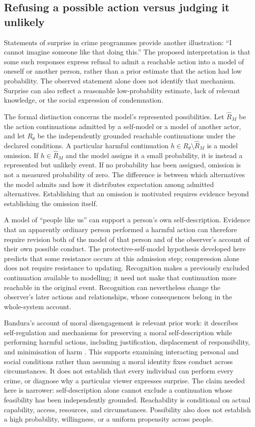 \documentclass[11pt,a4paper]{article}
\theoremstyle{remark}
\begin{document}
\subsection{Refusing a possible action versus judging it unlikely}

Statements of surprise in crime programmes provide another illustration:
``I cannot imagine someone like that doing this.'' The proposed interpretation
is that some such responses express refusal to admit a reachable action into a
model of oneself or another person, rather than a prior estimate that the action
had low probability. The observed statement alone does not identify that
mechanism. Surprise can also reflect a reasonable low-probability estimate,
lack of relevant knowledge, or the social expression of condemnation.

The formal distinction concerns the model's represented possibilities. Let
$\widehat R_M$ be the action continuations admitted by a self-model or a model
of another actor, and let $R_\theta$ be the independently grounded reachable
continuations under the declared conditions. A particular harmful continuation
$h\in R_\theta\setminus\widehat R_M$ is a model omission. If $h\in\widehat R_M$
and the model assigns it a small probability, it is instead a represented but
unlikely event. If no probability has been assigned, omission is not a measured
probability of zero. The difference is between which alternatives the model
admits and how it distributes expectation among admitted alternatives.
Establishing that an omission is motivated requires evidence beyond establishing
the omission itself.

A model of ``people like us'' can support a person's own self-description.
Evidence that an apparently ordinary person performed a harmful action can
therefore require revision both of the model of that person and of the observer's
account of their own possible conduct. The protective-self-model hypothesis
developed here predicts that some resistance occurs at this admission step;
compression alone does not require resistance to updating. Recognition makes a previously
excluded continuation available to modelling; it need not make that continuation
more reachable in the original event. Recognition can nevertheless change the
observer's later actions and relationships, whose consequences belong in the
whole-system account.

Bandura's account of moral disengagement is relevant prior work: it describes
self-regulation and mechanisms for preserving a moral self-description while
performing harmful actions, including justification, displacement of
responsibility, and minimisation of harm \citep{bandura2002disengagement}.
This supports examining interacting personal and social conditions rather than
assuming a moral identity fixes conduct across circumstances. It does not
establish that every individual can perform every crime, or diagnose why a
particular viewer expresses surprise. The claim needed here is narrower:
self-description alone cannot exclude a continuation whose feasibility has
been independently grounded. Reachability is conditional on actual capability,
access, resources, and circumstances. Possibility also does not establish a high
probability, willingness, or a uniform propensity across people.
\end{document}
